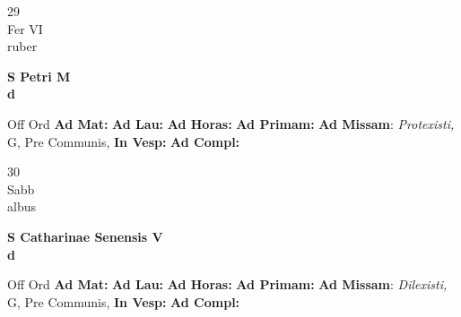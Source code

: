 \documentclass[10pt, openany]{book}
\begin{document}
        \begin{center}
            \begin{minipage}{3.5in}
                \vspace{2em}
                \begin{minipage}{0.5in}
                    {\Huge 29} \\
                    {\normalsize Fer VI} \\
                    {\normalsize ruber}
                \end{minipage}
                \begin{minipage}{3.0in}
                    \textbf{ \large S Petri M \\
                    \textnormal{\normalsize d}} \\ 
                \end{minipage}
                \begin{justify}Off Ord
                    \textbf{Ad Mat: }
                    \textbf{Ad Lau: }
                    \textbf{Ad Horas: }
                    \textbf{Ad Primam: }\textbf{Ad Missam}: \textit{Protexisti,} G, Pre Communis,  
                    \textbf{In Vesp: }
                    \textbf{Ad Compl: }
                \end{justify}
            \end{minipage}
        \end{center}
    
        \begin{center}
            \begin{minipage}{3.5in}
                \vspace{2em}
                \begin{minipage}{0.5in}
                    {\Huge 30} \\
                    {\normalsize Sabb} \\
                    {\normalsize albus}
                \end{minipage}
                \begin{minipage}{3.0in}
                    \textbf{ \large S Catharinae Senensis V \\
                    \textnormal{\normalsize d}} \\ 
                \end{minipage}
                \begin{justify}Off Ord
                    \textbf{Ad Mat: }
                    \textbf{Ad Lau: }
                    \textbf{Ad Horas: }
                    \textbf{Ad Primam: }\textbf{Ad Missam}: \textit{Dilexisti,} G, Pre Communis,  
                    \textbf{In Vesp: }
                    \textbf{Ad Compl: }
                \end{justify}
            \end{minipage}
        \end{center}
    
\end{document}
